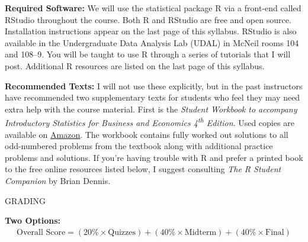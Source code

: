 \documentclass[11pt, letterpaper]{article}
\begin{document}
\noindent \textbf{Required Software:} 
We will use the statistical package R via a front-end called RStudio throughout the course. 
Both R and RStudio are free and open source. Installation instructions appear on the last page of this syllabus.
RStudio is also available in the Undergraduate Data Analysis Lab (UDAL) in McNeil rooms 104 and 108--9. 
You will be taught to use R through a series of tutorials that I will post. Additional R resources are listed on the last page of this syllabus.

\medskip

\noindent \textbf{Recommended Texts:} 
I will not use these explicitly, but in the past instructors have recommended two
supplementary texts for students who feel they may need extra help with the course material. First is the \emph{Student Workbook to accompany Introductory Statistics for Business and Economics 4\textsuperscript{th} Edition}. 
Used copies are available on \href{http://www.amazon.com/gp/offer-listing/0471508993/sr=/qid=/ref=olp_page_2?ie=UTF8&colid=&coliid=&condition=all&me=&qid=&shipPromoFilter=0&sort=sip&sr=&startIndex=10}{Amazon}. 
The workbook contains fully worked out solutions to all odd-numbered problems from the textbook along with additional practice problems and solutions.
If you're having trouble with R and prefer a printed book to the free online resources listed below, I suggest consulting \emph{The R Student Companion} by Brian Dennis.


\newpage




\begin{center}
\small
GRADING
\end{center}

\noindent \textbf{Two Options:}
	\begin{equation*}
	\begin{split}
		\mbox{Overall Score} = (20\% \times \mbox{Quizzes})  + (40\% \times \mbox{Midterm}) + (40\% \times \mbox{Final})
	\end{split}
	\end{equation*}
\end{document}
